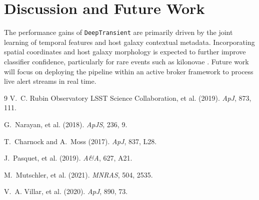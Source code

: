 \section{Discussion and Future Work}
The performance gains of \texttt{DeepTransient} are primarily driven by the joint learning of temporal features and host galaxy contextual metadata. Incorporating spatial coordinates and host galaxy morphology is expected to further improve classifier confidence, particularly for rare events such as kilonovae \cite{mutschler2021, villar2020}. Future work will focus on deploying the pipeline within an active broker framework to process live alert streams in real time.

\begin{thebibliography}{9}
V.~C. Rubin Observatory LSST Science Collaboration, et al. (2019).
\newblock \emph{ApJ}, 873, 111.

G.~Narayan, et al. (2018).
\newblock \emph{ApJS}, 236, 9.

T.~Charnock and A.~Moss (2017).
\newblock \emph{ApJ}, 837, L28.

J.~Pasquet, et al. (2019).
\newblock \emph{A\&A}, 627, A21.

M.~Mutschler, et al. (2021).
\newblock \emph{MNRAS}, 504, 2535.

V.~A. Villar, et al. (2020).
\newblock \emph{ApJ}, 890, 73.
\end{thebibliography}
